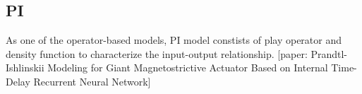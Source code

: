 \subsection{PI}\label{sec:chapter3:pi}
As one of the operator-based models, PI model constists of play operator and density function to characterize the
input-output relationship.
[paper: Prandtl-Ishlinskii Modeling for Giant Magnetostrictive Actuator Based on Internal Time-Delay Recurrent Neural Network]
